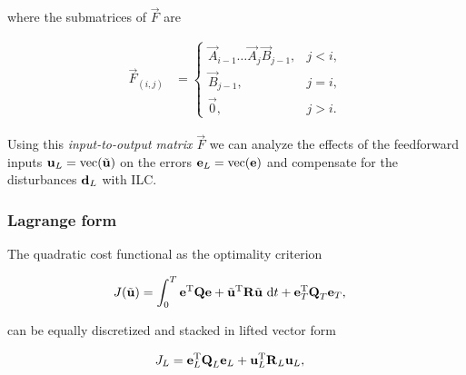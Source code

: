 \noindent where the submatrices of $\vec{F}$ are

\begin{equation}
\begin{aligned}
\vec{F}_{(i,j)} &= \left \{
\begin{array}{cc}
\vec{A}_{i-1}\ldots \vec{A}_j \vec{B}_{j-1}, & j < i, \\ 
\vec{B}_{j-1}, & j = i, \\
\vec{0}, & j > i. 
\end{array} \right.
\end{aligned}
\label{Fmatrix}
\end{equation}

\noindent Using this \emph{input-to-output matrix} $\vec{F}$ we can analyze the effects of the feedforward inputs $\boldsymbol{\mathrm{u}}_L = \operatorname{vec}(\tilde{\boldsymbol{\mathrm{u}}})$ on the errors $\boldsymbol{\mathrm{e}}_L = \operatorname{vec}(\boldsymbol{\mathrm{e}})$ and compensate for the disturbances $\boldsymbol{\mathrm{d}}_L$ with ILC.


\subsubsection{Lagrange form} The quadratic cost functional as the optimality criterion

\begin{equation}
\begin{aligned}
J(\tilde{\boldsymbol{\mathrm{u}}}) &= \int_{0}^{T} \boldsymbol{\mathrm{e}}^{\mathrm{T}}\boldsymbol{\mathrm{Q}}\boldsymbol{\mathrm{e}} + \tilde{\boldsymbol{\mathrm{u}}}^{\mathrm{T}}\boldsymbol{\mathrm{R}}\tilde{\boldsymbol{\mathrm{u}}} \ \mathrm{d}t + \boldsymbol{\mathrm{e}}_{T}^{\mathrm{T}}\boldsymbol{\mathrm{Q}}_{T}\boldsymbol{\mathrm{e}}_{T},
\end{aligned}
\label{cost}
\end{equation}

\noindent can be equally discretized and stacked in lifted vector form

\begin{equation}
\begin{aligned}
J_L &= \boldsymbol{\mathrm{e}}_L^{\mathrm{T}}\boldsymbol{\mathrm{Q}}_L\boldsymbol{\mathrm{e}}_L + \boldsymbol{\mathrm{u}}_L^{\mathrm{T}}\boldsymbol{\mathrm{R}}_L\boldsymbol{\mathrm{u}}_L,
\end{aligned}
\label{costFunctional}
\end{equation}

